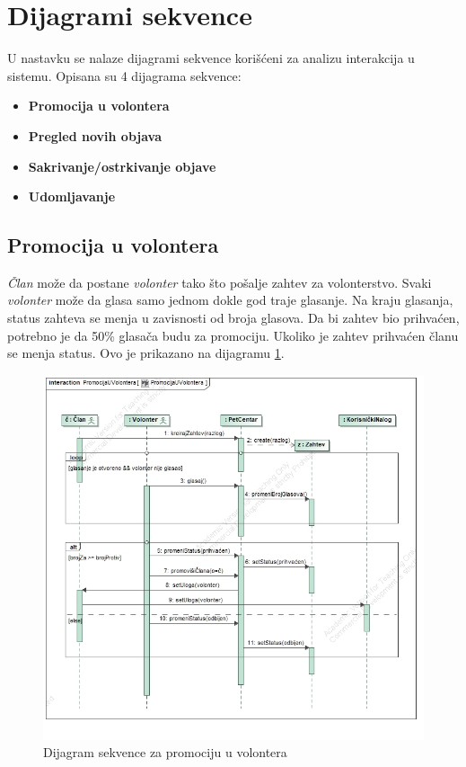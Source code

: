 \section{Dijagrami sekvence}
\par U nastavku se nalaze dijagrami sekvence korišćeni za analizu interakcija u sistemu. Opisana su 4 dijagrama sekvence:
\begin{itemize}
    \item \textbf{Promocija u volontera}
    \item \textbf{Pregled novih objava}
    \item \textbf{Sakrivanje/ostrkivanje objave}
    \item \textbf{Udomljavanje}
\end{itemize}
\subsection{Promocija u volontera}
\par \textit{Član} može da postane \textit{volonter} tako što pošalje zahtev za volonterstvo. Svaki \textit{volonter} može da glasa samo jednom dokle god traje glasanje. 
Na kraju glasanja, status zahteva se menja u zavisnosti od broja glasova. Da bi zahtev bio prihvaćen,
potrebno je da 50\% glasača budu za promociju. Ukoliko je zahtev prihvaćen članu se menja status. Ovo je prikazano na dijagramu \ref{fig:promotion-seq}.
\begin{figure}[h]
    \centering
    \includegraphics[width=\textwidth, height=0.9\textwidth]{img/promote-member-sequence.jpg}
    \caption{Dijagram sekvence za promociju u volontera}
    \label{fig:promotion-seq}
\end{figure}
